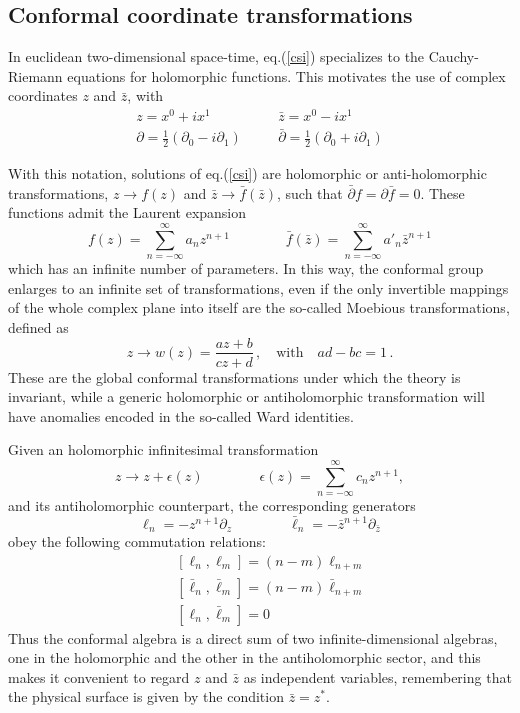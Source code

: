\documentclass[a4paper,12pt]{report}
\begin{document}
\subsection{Conformal coordinate transformations}

In euclidean two-dimensional space-time, eq.(\ref{csi}) specializes to the Cauchy-Riemann equations for
holomorphic functions. This motivates the use of complex coordinates $z$ and $\bar{z}$, with
\begin{eqnarray}\label{z}
z=x^{0}+ix^{1} && \quad \bar{z}=x^{0}-ix^{1}\\
\partial=\frac{1}{2}(\partial_{0}-i\partial_{1}) && \quad \bar{\partial}=\frac{1}{2}(\partial_{0}+i\partial_{1})
\end{eqnarray}

With this notation, solutions of eq.(\ref{csi}) are holomorphic or anti-holomorphic transformations,
$z\rightarrow f(z)$ and $\bar{z}\rightarrow \bar{f}(\bar{z})$, such that $\bar{\partial}f=\partial\bar{f}=0$.
These functions admit the Laurent expansion
\begin{equation}\label{lau}
f(z)=\sum_{n=-\infty}^{\infty}a_{n}z^{n+1} \qquad \qquad
\bar{f}(\bar{z})=\sum_{n=-\infty}^{\infty}a'_{n}\bar{z}^{n+1}
\end{equation}
which has an infinite number of parameters. In this way, the conformal group enlarges to an infinite set of
transformations, even if the only invertible mappings of the whole complex plane into itself are the so-called
Moebious transformations, defined as
\begin{equation}\label{moebious}
z\rightarrow w(z)=\frac{az+b}{cz+d}\,,\quad \textrm{with} \quad ad-bc=1 \,.
\end{equation}
These are the global conformal transformations under which the theory is invariant, while a generic holomorphic
or antiholomorphic transformation will have anomalies encoded in the so-called Ward identities.

\vspace{0.5cm}

Given an holomorphic infinitesimal transformation
\begin{equation}\label{lauinf}
z\rightarrow z+\epsilon(z) \qquad \qquad \epsilon(z)=\sum_{n=-\infty}^{\infty}c_{n}z^{n+1},
\end{equation}
and its antiholomorphic counterpart, the corresponding generators
\begin{equation}\label{gencl}
\ell_{n}=-z^{n+1}\partial_{z}\qquad\qquad \bar{\ell}_{n}=-\bar{z}^{n+1}\partial_{\bar{z}}
\end{equation}
obey the following commutation relations:
\begin{eqnarray}\label{vircl}
&& [\ell_{n},\ell_{m}]=(n-m)\ell_{n+m}\\
&& [\bar{\ell}_{n},\bar{\ell}_{m}]=(n-m)\bar{\ell}_{n+m}\\
&& [\ell_{n},\bar{\ell}_{m}]=0
\end{eqnarray}
Thus the conformal algebra is a direct sum of two infinite-dimensional algebras, one in the holomorphic and the
other in the antiholomorphic sector, and this makes it convenient to regard $z$ and $\bar{z}$ as independent
variables, remembering that the physical surface is given by the condition $\bar{z}=z^{*}$.
\end{document}
